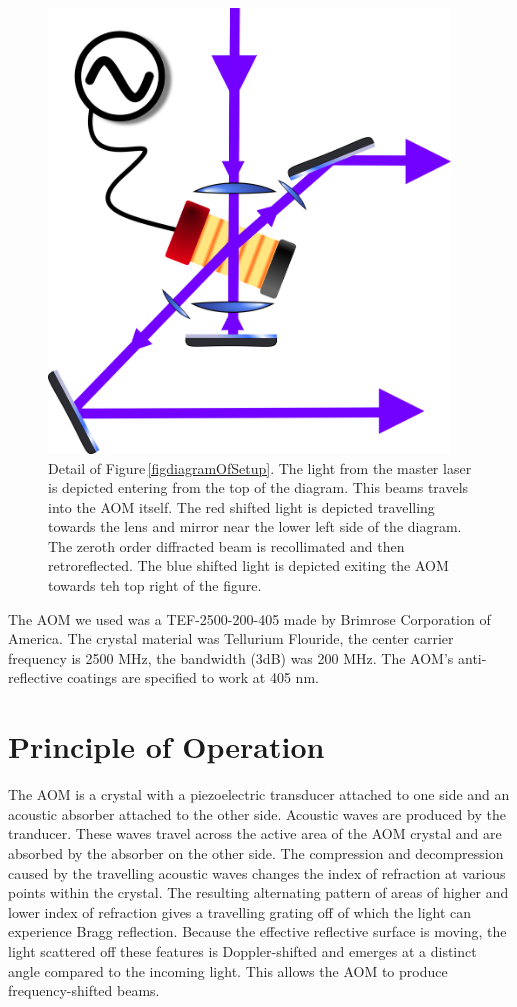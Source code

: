 \begin{figure}
\centerline{
\includegraphics[width=0.95\textwidth]{diagramOfJustAOM}}
\caption[AOM diagram]{\label{aomDiagramDetail} Detail of Figure\,\ref{figdiagramOfSetup}. The light from the master laser is depicted entering from the top of the diagram. This beams travels into the AOM itself. The red shifted light is depicted travelling towards the lens and mirror near the lower left side of the diagram. The zeroth order diffracted beam is recollimated and then retroreflected. The blue shifted light is depicted exiting the AOM towards teh top right of the figure.}
\end{figure}

The AOM we used was a TEF-2500-200-405 made by Brimrose Corporation of America. The crystal material was Tellurium Flouride, the center carrier frequency is 2500 MHz, the bandwidth (3dB) was 200 MHz. The AOM's anti-reflective coatings are specified to work at 405 nm. 
\section{Principle of Operation}

The AOM is a crystal with a piezoelectric transducer attached to one side and an acoustic absorber attached to the other side. Acoustic waves are produced by the tranducer. These waves travel across the active area of the AOM crystal and are absorbed by the absorber on the other side. The compression and decompression caused by the travelling acoustic waves changes the index of refraction at various points within the crystal. The resulting alternating pattern of areas of higher and lower index of refraction gives a travelling grating off of which the light can experience Bragg reflection. Because the effective reflective surface is moving, the light scattered off these features is Doppler-shifted and emerges at a distinct angle compared to the incoming light. This allows the AOM to produce frequency-shifted beams. 


